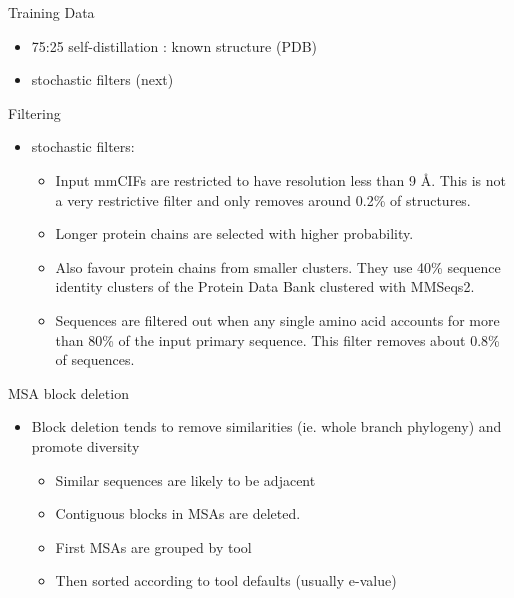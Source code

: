 \documentclass[presentation, smaller]{beamer}
\begin{document}
\begin{frame}[label={sec:orge857553}]{Training Data \cite{jumperHighlyAccurateProtein2021}}
\begin{itemize}
\item 75:25 self-distillation : known structure (PDB)
\item stochastic filters (next)
\end{itemize}
\end{frame}

\begin{frame}[label={sec:org433cc0a}]{Filtering \cite{jumperHighlyAccurateProtein2021}}
\begin{itemize}
\item stochastic filters: 
\begin{itemize}
\item Input mmCIFs are restricted to have resolution less than 9 Å. This is not a very restrictive filter and only removes around 0.2\% of structures.
\item Longer protein chains are selected with higher probability.
\item Also favour protein chains from smaller clusters. They use 40\% sequence identity clusters of the Protein Data Bank clustered with MMSeqs2.
\item Sequences are filtered out when any single amino acid accounts for more than 80\% of the input primary sequence. This filter removes about 0.8\% of sequences.
\end{itemize}
\end{itemize}
\end{frame}

\begin{frame}[label={sec:org0207119}]{MSA block deletion \cite{jumperHighlyAccurateProtein2021}}
\begin{itemize}
\item Block deletion tends to remove similarities (ie. whole branch phylogeny) and promote diversity
\begin{itemize}
\item Similar sequences are likely to be adjacent
\item Contiguous blocks in MSAs are deleted.
\item First MSAs are grouped by tool
\item Then sorted according to tool defaults (usually e-value)
\end{itemize}
\end{itemize}
\end{frame}
\end{document}

